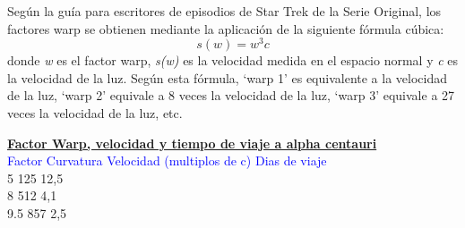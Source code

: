 \documentclass[a4paper,11pt]{article}
\begin{document}
Según la guía para escritores de episodios de Star Trek de la Serie Original, 
los factores warp se obtienen mediante la aplicación de la siguiente fórmula cúbica:
\begin{equation}
s(w) = w^3c
\end{equation}
donde \textit{w} es el factor warp, \textit{s(w)} es la velocidad medida 
en el espacio normal y 
\textit{c} es la velocidad de la luz. Según esta fórmula, `warp 1' 
es equivalente a la velocidad de la luz, `warp 2' equivale a 8 veces 
la velocidad de la luz, `warp 3' equivale a 27 veces la velocidad de la luz, etc.

\medskip

\hspace*{2mm} \ul{\textbf{Factor Warp, velocidad y tiempo de viaje a alpha centauri}} \\[3mm]
\hspace*{1mm} \textcolor{blue}{Factor Curvatura} \hspace{10mm} \textcolor{blue}{Velocidad (multiplos de c)} \hspace{10mm} 
\textcolor{blue}{Dias de viaje} \\[2mm]
\hspace*{15mm} 5 \hspace{45mm} 125 \hspace{35mm} 12,5 \\[1mm]
\hspace*{15mm} 8 \hspace{45mm} 512 \hspace{35mm} 4,1 \\[1mm]
\hspace*{15mm} 9.5 \hspace{42mm} 857 \hspace{35mm} 2,5 
\end{document}

